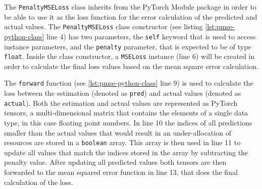     The \texttt{PenaltyMSELoss} class inherits from the PyTorch Module package in order to be able to use it as the loss function for the error calculation of the predicted and actual values.
    The \texttt{PenaltyMSELoss} class constructor (see listing \ref{lst:pmse-python-class} line 4) has two parameters, the \texttt{self} keyword that is used to access instance parameters, and the \texttt{penalty} parameter, that is expected to be of type \texttt{float}.
    Inside the class constructor, a \texttt{MSELoss} instance (line 6) will be created in order to calculate the final loss values based on the mean square error calculation.

    The \texttt{forward} function (see \ref{lst:pmse-python-class} line 9) is used to calculate the loss between the estimation (denoted as \texttt{pred}) and actual values (denoted as \texttt{actual}). Both the estimation and actual values are represented as PyTorch tensors, a multi-dimensional matrix that contains the elements of a single data type, in this case floating point numbers.
    In line 10 the indices of all predictions smaller than the actual values that would result in an under-allocation of resources are stored in a \texttt{boolean} array.
    This array is then used in line 11 to update all values that match the indices stored in the array by subtracting the penalty value.
    After updating all predicted values both tensors are then forwarded to the mean squared error function in line 13, that does the final calculation of the loss.
    

    


